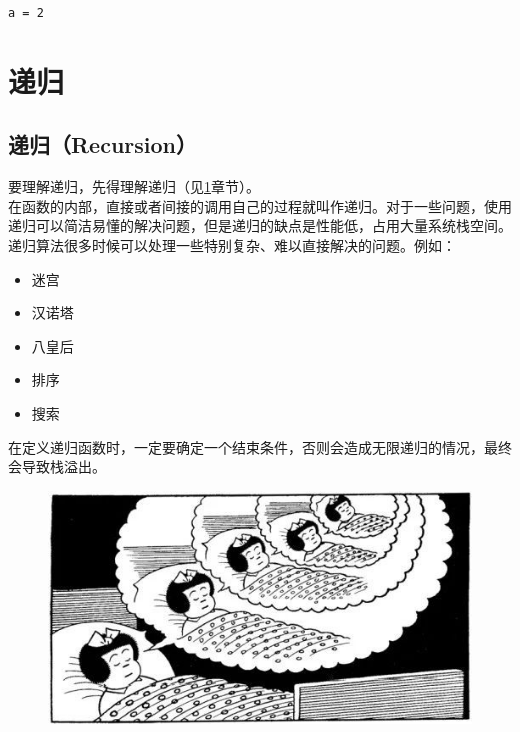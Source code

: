 \begin{tcolorbox}
	\begin{verbatim}
a = 2
	\end{verbatim}
\end{tcolorbox}

\newpage

\section{递归} \label{recursive}

\subsection{递归（Recursion）}

要理解递归，先得理解递归（见\ref{recursive}章节）。 \\

在函数的内部，直接或者间接的调用自己的过程就叫作递归。对于一些问题，使用递归可以简洁易懂的解决问题，但是递归的缺点是性能低，占用大量系统栈空间。 \\

递归算法很多时候可以处理一些特别复杂、难以直接解决的问题。例如：

\begin{itemize}
	\item 迷宫
	\item 汉诺塔
	\item 八皇后
	\item 排序
	\item 搜索
\end{itemize}

在定义递归函数时，一定要确定一个结束条件，否则会造成无限递归的情况，最终会导致栈溢出。

\begin{figure}[H]
	\centering
	\includegraphics[scale=0.7]{img/C13/13-3/1.png}
\end{figure}

